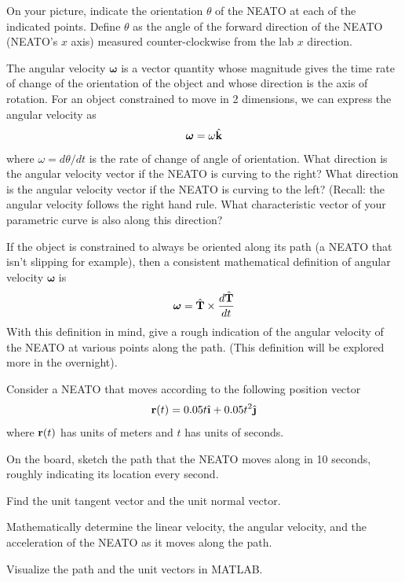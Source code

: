 \documentclass{tufte-handout}
\begin{document}
\item On your picture, indicate the orientation $\theta$ of the NEATO at each of the indicated points.  Define $\theta$ as the angle of the forward direction of the NEATO (NEATO's $x$ axis) measured counter-clockwise from the lab $x$ direction.

\item  The angular velocity $\boldsymbol \omega$ is a vector quantity whose magnitude gives the time rate of change of the orientation of the object and whose direction is the axis of rotation.  For an object constrained to move in 2 dimensions, we can express the angular velocity as
\[\boldsymbol \omega  = \omega \hat{\mathbf{k}} \]
where $\omega = d \theta / dt$ is the rate of change of angle of orientation. What direction is the angular velocity vector if the NEATO is curving to the right?  What direction is the angular velocity vector if the NEATO is curving to the left?  (Recall:  the angular velocity follows the right hand rule.  What characteristic vector of your parametric curve is also along this direction?

\item If the object is constrained to always be oriented along its path (a NEATO that isn't slipping for example), then a consistent mathematical definition of angular velocity $\boldsymbol \omega$  is
\[ \boldsymbol \omega  = \hat{\mathbf{T}} \times \frac{d \hat{\mathbf{T}}}{dt} \]
With this definition in mind, give a rough indication of the angular velocity of the NEATO at various points along the path. (This definition will be explored more in the overnight).  
\ee
    
\item Consider a NEATO that moves according to the following position vector
\[\r(t) = 0.05 t \ihat + 0.05 t^2 \jhat \]
where $\mathbf{r}(t)$ has units of meters and $t$ has units of seconds.

\be

\item On the board, sketch the path that the NEATO moves along in 10 seconds, roughly indicating its location every second.

\item Find the unit tangent vector and the unit normal vector.

\item Mathematically determine the linear velocity, the angular velocity, and the acceleration of the NEATO as it moves along the path.

\item Visualize the path and the unit vectors in MATLAB.
\ee
\end{document}
